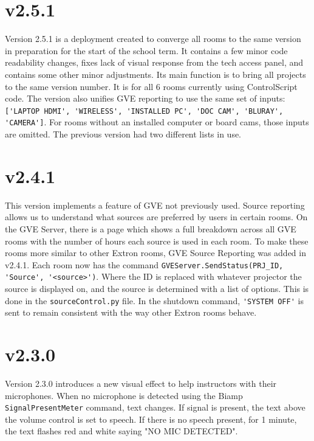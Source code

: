 \documentclass{article}
\begin{document}
\section*{v2.5.1}

Version 2.5.1 is a deployment created to converge all rooms to the same version in preparation for the start of the school 
term. It contains a few minor code readability changes, fixes lack of visual response from the tech access panel, and 
contains some other minor adjustments. Its main function is to bring all projects to the same version number. It is for 
all 6 rooms currently using ControlScript code. The version also unifies GVE reporting to use the same set of inputs: 
\lstinline|['LAPTOP HDMI', 'WIRELESS', 'INSTALLED PC', 'DOC CAM', 'BLURAY', 'CAMERA']|. For rooms without an installed 
computer or board cams, those inputs are omitted. The previous version had two different lists in use.

\section*{v2.4.1}

This version implements a feature of GVE not previously used. Source reporting allows us to understand what sources 
are preferred by users in certain rooms. On the GVE Server, there is a page which shows a full breakdown across all GVE
rooms with the number of hours each source is used in each room. To make these rooms more similar to other Extron rooms, 
GVE Source Reporting was added in v2.4.1. Each room now has the command \lstinline|GVEServer.SendStatus(PRJ_ID, 'Source', '<source>')|.
Where the ID is replaced with whatever projector the source is displayed on, and the source is determined with a list of options. 
This is done in the \lstinline|sourceControl.py| file. In the shutdown command, \lstinline|'SYSTEM OFF'| is sent to remain 
consistent with the way other Extron rooms behave. 

\section*{v2.3.0}

Version 2.3.0 introduces a new visual effect to help instructors with their microphones. When no microphone is detected
using the Biamp \lstinline|SignalPresentMeter| command, text changes. If signal is present, the text above the volume control 
is set to speech. If there is no speech present, for 1 minute, the text flashes red and white saying "NO MIC DETECTED". 
\end{document}
